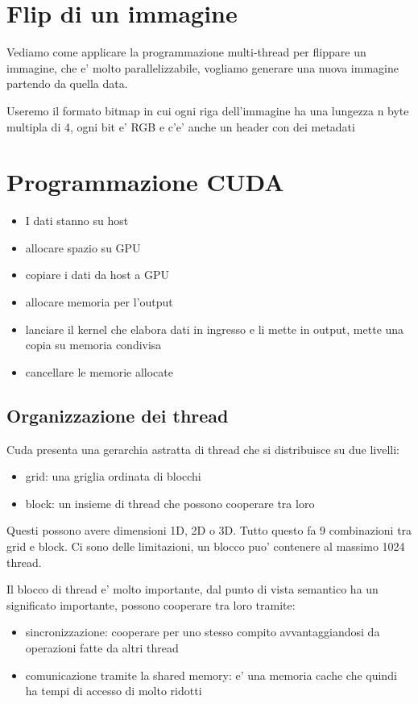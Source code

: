 \section{Flip di un immagine}
Vediamo come applicare la programmazione multi-thread per flippare un immagine, che e' molto parallelizzabile, vogliamo generare una nuova immagine partendo da quella data.

Useremo il formato bitmap in cui ogni riga dell'immagine ha una lungezza n byte multipla di 4, ogni bit e' RGB e c'e' anche un header con dei metadati

\section{Programmazione CUDA}
\begin{itemize}
    \item I dati stanno su host
    \item allocare spazio su GPU
    \item copiare i dati da host a GPU
    \item allocare memoria per l'output
    \item lanciare il kernel che elabora dati in ingresso e li mette in output, mette una copia su memoria condivisa
    \item cancellare le memorie allocate
\end{itemize}

\subsection{Organizzazione dei thread}
Cuda presenta una gerarchia astratta di thread che si distribuisce su due livelli:
\begin{itemize}
    \item grid: una griglia ordinata di blocchi
    \item block: un insieme di thread che possono cooperare tra loro
\end{itemize}
Questi possono avere dimensioni 1D, 2D o 3D. Tutto questo fa 9 combinazioni tra grid e block.
Ci sono delle limitazioni, un blocco puo' contenere al massimo 1024 thread.

Il blocco di thread e' molto importante, dal punto di vista semantico ha un significato importante, possono cooperare tra loro tramite:
\begin{itemize}
    \item sincronizzazione: cooperare per uno stesso compito avvantaggiandosi da operazioni fatte da altri thread
    \item comunicazione tramite la shared memory: e' una memoria cache che quindi ha tempi di accesso di molto ridotti
\end{itemize}

